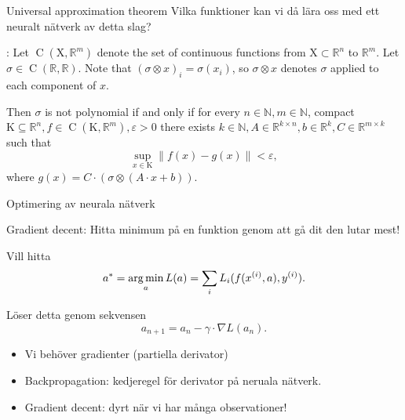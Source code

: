 \documentclass[10pt,english]{beamer}
\begin{document}
\begin{frame}{Universal approximation theorem}
    Vilka funktioner kan vi då lära oss med ett neuralt nätverk av detta slag?

    \begin{greenbox}
        : Let $\operatorname{C}(\mathrm{X},\mathbb{R}^{m})$ denote the set of continuous functions from $\mathrm{X} \subset \mathbb{R}^n$ to $\mathbb{R}^{m}$. Let $\sigma \in \operatorname{C}(\mathbb{R},\mathbb{R})$. Note that $(\sigma \otimes x)_i = \sigma(x_i)$, so $\sigma \otimes x$ denotes $\sigma$ applied to each component of $x$.

        Then $\sigma$ is not polynomial if and only if for every $n \in \mathbb{N}, m \in \mathbb{N}$, compact $\mathrm{K} \subseteq \mathbb{R}^n, f \in \operatorname{C}(\mathrm{K},\mathbb{R}^m), \varepsilon > 0$ there exists $k \in \mathbb{N}, A \in \mathbb{R}^{k \times n}, b \in \mathbb{R}^k, C \in \mathbb{R}^{m \times k}$ such that
        \begin{equation*}
            \sup_{x \in \mathrm{K}} \| f(x) - g(x) \| < \varepsilon,
        \end{equation*}
        where $g(x) = C \cdot (\sigma \otimes (A \cdot x + b))$.
    \end{greenbox}
\end{frame}

\begin{frame}{Optimering av neurala nätverk}
    
    Gradient decent: Hitta minimum på en funktion genom att gå dit den lutar mest!

    Vill hitta
    \begin{equation*}
        a^* = \operatorname*{arg\,min}_a L(a) = \sum_i L_i(f(x^{(i)},a), y^{(i)}).
    \end{equation*}

    Löser detta genom sekvensen
    \begin{equation*}
        a_{n+1} = a_n - \gamma \cdot \nabla L(a_n).
    \end{equation*}

    \begin{itemize}
        \item Vi behöver gradienter (partiella derivator)
        \item Backpropagation: kedjeregel för derivator på neruala nätverk.
        \item Gradient decent: dyrt när vi har många observationer!
    \end{itemize}

\end{frame}
\end{document}
